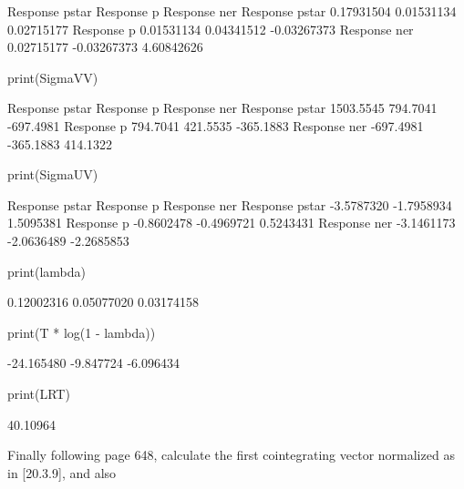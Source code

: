 \documentclass[a4paper]{article}
\renewcommand{\~}{\perispomeni}%
\begin{document}
\begin{Schunk}
\begin{Soutput}
               Response pstar  Response p Response ner
Response pstar     0.17931504  0.01531134   0.02715177
Response p         0.01531134  0.04341512  -0.03267373
Response ner       0.02715177 -0.03267373   4.60842626
\end{Soutput}
\begin{Sinput}
 print(SigmaVV)
\end{Sinput}
\begin{Soutput}
               Response pstar Response p Response ner
Response pstar      1503.5545   794.7041    -697.4981
Response p           794.7041   421.5535    -365.1883
Response ner        -697.4981  -365.1883     414.1322
\end{Soutput}
\begin{Sinput}
 print(SigmaUV)
\end{Sinput}
\begin{Soutput}
               Response pstar Response p Response ner
Response pstar     -3.5787320 -1.7958934    1.5095381
Response p         -0.8602478 -0.4969721    0.5243431
Response ner       -3.1461173 -2.0636489   -2.2685853
\end{Soutput}
\begin{Sinput}
 print(lambda)
\end{Sinput}
\begin{Soutput}
[1] 0.12002316 0.05077020 0.03174158
\end{Soutput}
\begin{Sinput}
 print(T * log(1 - lambda))
\end{Sinput}
\begin{Soutput}
[1] -24.165480  -9.847724  -6.096434
\end{Soutput}
\begin{Sinput}
 print(LRT)
\end{Sinput}
\begin{Soutput}
[1] 40.10964
\end{Soutput}
\end{Schunk}
Finally following page 648, calculate the first cointegrating vector normalized as in [20.3.9], and also
\end{document}
